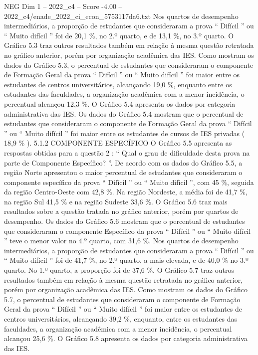 \begin{textsample}{NEG Dim 1 – 2022\_c4 – Score -4.00 – 2022\_c4/enade\_2022\_ci\_econ\_5753117da6.txt}
Nos quartos de desempenho intermediários, a proporção de estudantes que consideraram a prova “ Difícil ” ou “ Muito difícil ” foi de 20,1 \%, no 2.º quarto, e de 13,1 \%, no 3.º quarto.
O Gráfico 5.3 traz outros resultados também em relação à mesma questão retratada no gráfico anterior, porém por organização acadêmica das IES.
Como mostram os dados do Gráfico 5.3, o percentual de estudantes que consideraram o componente de Formação Geral da prova “ Difícil ” ou “ Muito difícil ” foi maior entre os estudantes de centros universitários, alcançando 19,0 \%, enquanto entre os estudantes das faculdades, a organização acadêmica com a menor incidência, o percentual alcançou 12,3 \%.
O Gráfico 5.4 apresenta os dados por categoria administrativa das IES.
Os dados do Gráfico 5.4 mostram que o percentual de estudantes que consideraram o componente de Formação Geral da prova “ Difícil ” ou “ Muito difícil ” foi maior entre os estudantes de cursos de IES privadas ( 18,9 \% ). 5.1.2 COMPONENTE ESPECÍFICO O Gráfico 5.5 apresenta as respostas obtidas para a questão 2 : “ Qual o grau de dificuldade desta prova na parte de Componente Específico? ”.
De acordo com os dados do Gráfico 5.5, a região Norte apresentou o maior percentual de estudantes que consideraram o componente específico da prova “ Difícil ” ou “ Muito difícil ”, com 45 \%, seguida da região Centro-Oeste com 42,8 \%.
Na região Nordeste, a média foi de 41,7 \%, na região Sul 41,5 \% e na região Sudeste 33,6 \%.
O Gráfico 5.6 traz mais resultados sobre a questão tratada no gráfico anterior, porém por quartos de desempenho.
Os dados do Gráfico 5.6 mostram que o percentual de estudantes que consideraram o componente Específico da prova “ Difícil ” ou “ Muito difícil ” teve o menor valor no 4.º quarto, com 31,6 \%.
Nos quartos de desempenho intermediários, a proporção de estudantes que consideraram a prova “ Difícil ” ou “ Muito difícil ” foi de 41,7 \%, no 2.º quarto, a mais elevada, e de 40,0 \% no 3.º quarto.
No 1.º quarto, a proporção foi de 37,6 \%.
O Gráfico 5.7 traz outros resultados também em relação à mesma questão retratada no gráfico anterior, porém por organização acadêmica das IES.
Como mostram os dados do Gráfico 5.7, o percentual de estudantes que consideraram o componente de Formação Geral da prova “ Difícil ” ou “ Muito difícil ” foi maior entre os estudantes de centros universitários, alcançando 39,2 \%, enquanto, entre os estudantes das faculdades, a organização acadêmica com a menor incidência, o percentual alcançou 25,6 \%.
O Gráfico 5.8 apresenta os dados por categoria administrativa das IES.

\end{textsample}
